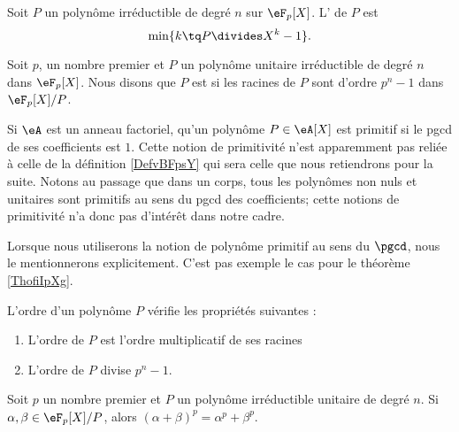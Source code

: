 \begin{definition}\label{DefvBFpsY}
    Soit \( P\) un polynôme irréductible de degré \( n\) sur \( \eF_p[X]\). L' de \( P\) est
    \begin{equation}
        \min\{ k\tq P\divides X^k-1 \}.
    \end{equation}

    Soit \( p\), un nombre premier et \( P\) un polynôme unitaire irréductible de degré $n$ dans \( \eF_p[X]\). Nous disons que \( P\) est  si les racines de \( P\) sont d'ordre \( p^n-1\) dans \( \eF_p[X]/P\).
\end{definition}

\begin{remark}  \label{RemwwJbYP}
    Si \( \eA\) est un anneau factoriel,  qu'un polynôme \( P\in \eA[X]\) est primitif si le pgcd de ses coefficients est \( 1\). Cette notion de primitivité n'est apparemment pas reliée à celle de la définition \ref{DefvBFpsY} qui sera celle que nous retiendrons pour la suite. Notons au passage que dans un corps, tous les polynômes non nuls et unitaires sont primitifs au sens du pgcd des coefficients; cette notions de primitivité n'a donc pas d'intérêt dans notre cadre.

    Lorsque nous utiliserons la notion de polynôme primitif au sens du \( \pgcd\), nous le mentionnerons explicitement. C'est pas exemple le cas pour le théorème \ref{ThofiIpXg}.
\end{remark}

\begin{proposition}
    L'ordre d'un polynôme \( P\) vérifie les propriétés suivantes :
    \begin{enumerate}
        \item
            L'ordre de \( P\) est l'ordre multiplicatif de ses racines
        \item
            L'ordre de \( P\) divise \( p^n-1\).
    \end{enumerate}
\end{proposition}

\begin{lemma}       \label{LemZrUUOz}
    Soit \( p\) un nombre premier et \( P\) un polynôme irréductible unitaire de degré \( n\). Si \( \alpha,\beta\in \eF_p[X]/P\), alors \( (\alpha+\beta)^p=\alpha^p+\beta^p\).
\end{lemma}

